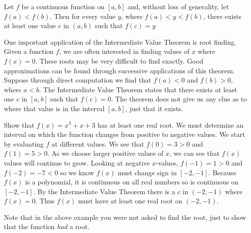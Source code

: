 \begin{theorem}\label{thm:IVT}%
Let $f$ be a continuous function on $[a,b]$ and, without loss of generality, let $f(a) < f(b)$. Then for every value $y$, where $f(a) < y < f(b)$, there exists at least one value $c$ in $(a,b)$ such that $f(c) = y$
\end{theorem}


One important application of the Intermediate Value Theorem is root finding. Given a function $f$, we are often interested in finding values of $x$ where $f(x) = 0$. These roots may be very difficult to find exactly. Good approximations can be found through successive applications of this theorem. Suppose through direct computation we find that $f(a) <0 $ and $f(b)>0$, where $a<b$. The Intermediate Value Theorem states that there exists at least one $c$ in $[a,b]$ such that $f(c) = 0$. The theorem does not give us any clue as to where that value is in the interval $[a,b]$, just that it exists. 

\begin{example}\label{ex_root_exists}%
Show that $f(x)=x^3+x+3$ has at least one real root.
\solution
We must determine an interval on which the function changes from positive to negative values. We start by evaluating $f$ at different values. We see that $f(0)=3>0$ and $f(1)=5>0$. As we choose larger positive values of $x$, we can see that $f(x)$ values will continue to grow. Looking at negative $x$-values, $f(-1)=1>0$ and $f(-2)=-7<0$ so we know $f(x)$ must change sign in $[-2,-1]$.  Because $f(x)$ is a polynomial, it is continuous on all real numbers so is continuous on $[-2,-1]$. By the Intermediate Value Theorem there is a $c$ in $(-2,-1)$ where $f(x)=0$. Thus $f(x)$ must have at least one real root on $(-2,-1)$.
\end{example}

Note that in the above example you were not asked to find the root, just to show that the function \emph{had} a root. %

